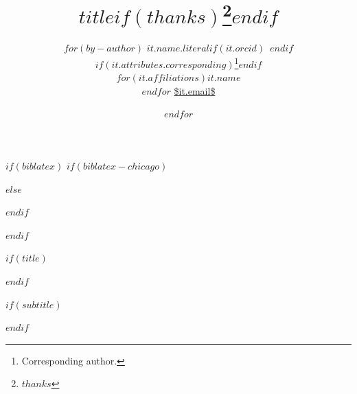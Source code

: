 $if(biblatex)$
$if(biblatex-chicago)$
\usepackage[$if(biblio-style)$$biblio-style$,$endif$$for(biblatexoptions)$$biblatexoptions$$sep$,$endfor$]{biblatex-chicago}
$else$
\usepackage[$if(biblio-style)$style=$biblio-style$,$endif$$for(biblatexoptions)$$biblatexoptions$$sep$,$endfor$]{biblatex}
$endif$

\usepackage{fontawesome5}

\newcommand{\reporttitle}[1]{\renewcommand{\reporttitle}{#1}}
\newcommand{\reportsubtitle}[1]{\renewcommand{\reportsubtitle}{#1}}
\newcommand{\reportauthors}[1]{\renewcommand{\reportauthors}{#1}}
\newcommand{\reportdate}[1]{\renewcommand{\reportdate}{#1}}


\setlength\bibitemsep{0pt}  %
\renewcommand*{\bibfont}{\footnotesize}  %
\setlength\bibhang{\parindent}  %



$endif$


$if(title)$
\reporttitle{$title$}
\title{$title$$if(thanks)$\thanks{$thanks$}$endif$}
$endif$

$if(subtitle)$
\usepackage{etoolbox}
\makeatletter
\providecommand{\subtitle}[1]{%
  \apptocmd{\@title}{\par {\vskip 0.25em \large #1 \par}}{}{}
}
\makeatother
\subtitle{$subtitle$}
\reportsubtitle{$subtitle$}
$endif$

\author{
$for(by-author)$
{ $it.name.literal$$if(it.orcid)$~$endif$}%
$if(it.attributes.corresponding)$\thanks{Corresponding author.}$endif$ \\%
$for(it.affiliations)${\footnotesize $it.name$} \\$endfor$%
{\footnotesize \url{$it.email$}} \and
$endfor$
}

\reportauthors{
\large
$for(by-author)$
$it.name.literal$$for(it.affiliations)$\textsuperscript{$it.number$}$sep$,$endfor$$if(it.orcid)$~\orcidlink{$it.orcid$}$endif$$if(it.email)$~\href{mailto:$it.email$}{\faEnvelope}$endif$$sep$,  
$endfor$

\par\vspace{0.8em}

\footnotesize
$for(affiliations)$
\textsuperscript{$it.number$} $it.name$\par
$endfor$
}

